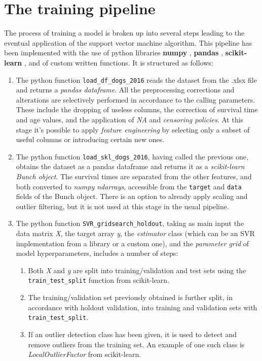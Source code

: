 \documentclass[12pt]{report}
\begin{document}
\section{The training pipeline}
The process of training a model is broken up into several steps leading to the eventual application of the support vector machine algorithm. This pipeline has been implemented with the use of python libraries \textbf{numpy} \cite{numpy}, \textbf{pandas} \cite{pandas}, \textbf{scikit-learn} \cite{sklearn}, and of custom written functions. It is structured as follows:
\begin{enumerate}
\item The python function \texttt{load\_df\_dogs\_2016} reads the dataset from the .xlsx file and returns a \textit{pandas dataframe}. All the preprocessing corrections and alterations are selectively performed in accordance to the calling parameters. These include the dropping of useless columns, the correction of survival time and age values, and the application of \textit{NA} and \textit{censoring policies}. At this stage it's possible to apply \textit{feature engineering} by selecting only a subset of useful columns or introducing certain new ones.
\item The python function \texttt{load\_skl\_dogs\_2016}, having called the previous one, obtains the dataset as a pandas dataframe and returns it as a \textit{scikit-learn Bunch object}. The survival times are separated from the other features, and both converted to \textit{numpy ndarrays}, accessible from the \texttt{target} and \texttt{data} fields of the Bunch object. There is an option to already apply scaling and outlier filtering, but it is not used at this stage in the usual pipeline.
\item The python function \texttt{SVR\_gridsearch\_holdout}, taking as main input the data matrix \textit{X}, the target array \textit{y}, the \textit{estimator} class (which can be an SVR implementation from a library or a custom one), and the \textit{parameter grid} of model hyperparameters, includes a number of steps:
\begin{enumerate}
\item Both \textit{X} and \textit{y} are split into training/validation and test sets using the \texttt{train\_test\_split} function from scikit-learn.
\item The training/validation set previously obtained is further split, in accordance with holdout validation, into training and validation sets with \texttt{train\_test\_split}.
\item If an outlier detection class has been given, it is used to detect and remove outliers from the training set. An example of one such class is \textit{LocalOutlierFactor} from scikit-learn.

\end{enumerate}
\end{enumerate}
\end{document}
